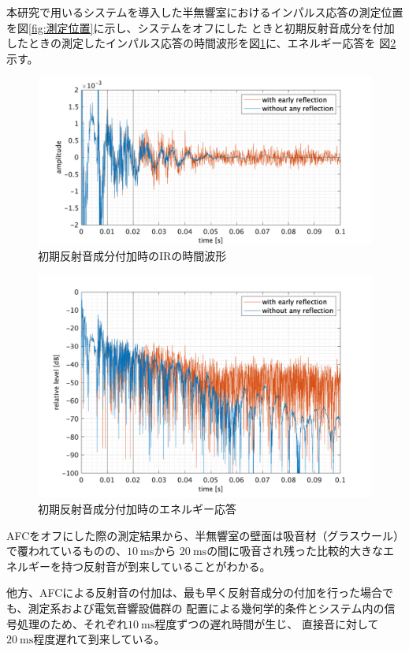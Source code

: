 \documentclass[11pt,a4j]{jreport}
\begin{document}
    本研究で用いるシステムを導入した半無響室におけるインパルス応答の測定位置を図\ref{fig:測定位置}に示し、システムをオフにした
    ときと初期反射音成分を付加したときの測定したインパルス応答の時間波形を図\ref{fig:初期反射音付加の時間波形}に、エネルギー応答を
    図\ref{fig:初期反射音付加のエネルギー応答}示す。
    
    \begin{figure}[H]
      \centering
      \includegraphics[width=.8\linewidth]{images/preStudy/timeWaveEarlyAdding.png}
      \caption{初期反射音成分付加時のIRの時間波形}
      \label{fig:初期反射音付加の時間波形}
    \end{figure}

    \begin{figure}[H]
      \centering
      \includegraphics[width=.8\linewidth]{images/preStudy/energyResponseEarlyAdded.png}
      \caption{初期反射音成分付加時のエネルギー応答}
      \label{fig:初期反射音付加のエネルギー応答}
    \end{figure}
    

    AFCをオフにした際の測定結果から、半無響室の壁面は吸音材（グラスウール）で覆われているものの、$\SI{10}{\ms}$から
    $\SI{20}{\ms}$の間に吸音され残った比較的大きなエネルギーを持つ反射音が到来していることがわかる。
    
    他方、AFCによる反射音の付加は、最も早く反射音成分の付加を行った場合でも、測定系および電気音響設備群の
    配置による幾何学的条件とシステム内の信号処理のため、それぞれ$\SI{10}{\ms}$程度ずつの遅れ時間が生じ、
    直接音に対して$\SI{20}{\ms}$程度遅れて到来している。
\end{document}
